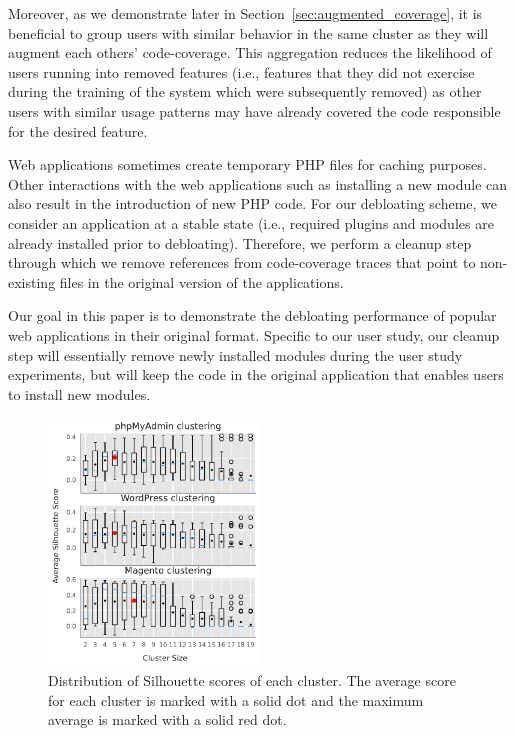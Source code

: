Moreover, as we demonstrate later in Section~\ref{sec:augmented_coverage}, it is beneficial to group users with similar behavior in the same cluster as they will augment each others' code-coverage. 
This aggregation reduces the likelihood of users running into removed features (i.e., features that they did not exercise during the training of the system which were subsequently removed) as other users with similar usage patterns may have already covered the code responsible for the desired feature. 

Web applications sometimes create temporary PHP files for caching purposes. 
Other interactions with the web applications such as installing a new module can also result in the introduction of new PHP code. 
For our debloating scheme, we consider an application at a stable state (i.e., required plugins and modules are already installed prior to debloating). 
Therefore, we perform a cleanup step through which we remove references from code-coverage traces that point to non-existing files in the original version of the applications. 

Our goal in this paper is to demonstrate the debloating performance of popular web applications in their original format. 
Specific to our user study, our cleanup step will essentially remove newly installed modules during the user study experiments, but will keep the code in the original application that enables users to install new modules. 

\begin{figure}[]
    \centering
    \includegraphics[width=0.50\textwidth]{figures/dbltr/silhouette.pdf}
    \caption{Distribution of Silhouette scores of each cluster. The average score for each cluster is marked with a solid dot and the maximum average is marked with a solid red dot.}
    \label{fig:silhouette_scores}
    \vspace{-1em}
\end{figure}

